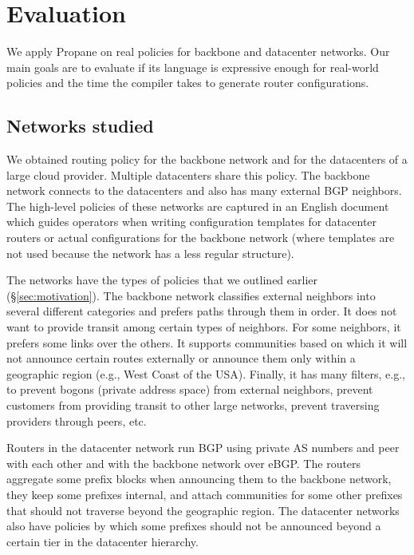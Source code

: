 \documentclass[10pt]{sigalternate052015}
\newcommand{\sysname}{{\small \sf Propane}\xspace}
\begin{document}
%
%
%
%


\section{Evaluation}
\label{sec:evaluation}


We apply \sysname on real policies for backbone and datacenter networks. Our main goals are to evaluate if its language is expressive enough for real-world policies and the time the compiler takes to generate router configurations.

\subsection{Networks studied}

We obtained routing policy for the backbone network and for the datacenters of a large cloud provider. Multiple datacenters share this policy. The backbone network connects to the datacenters and also has many external BGP neighbors. The high-level policies of these networks are captured in an English document which guides operators when writing configuration templates for datacenter routers or actual configurations for the backbone network (where templates are not used because the network has a less regular structure).

The networks have the types of policies that we outlined earlier (\S\ref{sec:motivation}). The backbone network classifies external neighbors into several different categories and prefers paths through them in order. It does not want to provide transit among certain types of neighbors. For some neighbors, it prefers some links over the others. It supports communities based on which it will not announce certain routes externally or announce them only within a geographic region (e.g., West Coast of the USA). Finally, it has many filters, e.g., to prevent bogons (private address space) from external neighbors, prevent customers from providing transit to other large networks, prevent traversing providers through peers, etc.

Routers in the datacenter network run BGP using private AS numbers and peer with each other and with the backbone network over eBGP. The routers aggregate some prefix blocks when announcing them to the backbone network, they keep some prefixes internal, and attach communities for some other prefixes that should not traverse beyond the geographic region. The datacenter networks also have policies by which some prefixes should not be announced beyond a certain tier in the datacenter hierarchy.
\end{document}
